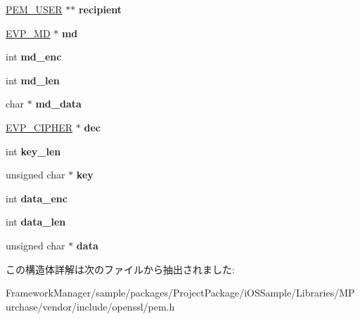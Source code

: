 \begin{DoxyCompactItemize}
\item 
\hypertarget{structpem__ctx__st_afa0b3aa999aedfd5e6feb3033a818cca}{}\hyperlink{structpem__recip__st}{P\+E\+M\+\_\+\+U\+S\+E\+R} $\ast$$\ast$ {\bfseries recipient}\label{structpem__ctx__st_afa0b3aa999aedfd5e6feb3033a818cca}

\item 
\hypertarget{structpem__ctx__st_ab27fcbc00038a731e6a73846db8eb9a1}{}\hyperlink{structenv__md__st}{E\+V\+P\+\_\+\+M\+D} $\ast$ {\bfseries md}\label{structpem__ctx__st_ab27fcbc00038a731e6a73846db8eb9a1}

\item 
\hypertarget{structpem__ctx__st_a84e1ec0487b7a71cd941858d667c91ec}{}int {\bfseries md\+\_\+enc}\label{structpem__ctx__st_a84e1ec0487b7a71cd941858d667c91ec}

\item 
\hypertarget{structpem__ctx__st_ab6ce4983829da473db829d6a620e663d}{}int {\bfseries md\+\_\+len}\label{structpem__ctx__st_ab6ce4983829da473db829d6a620e663d}

\item 
\hypertarget{structpem__ctx__st_a9cfdebfaf0e986b87cfe5b8ac80376da}{}char $\ast$ {\bfseries md\+\_\+data}\label{structpem__ctx__st_a9cfdebfaf0e986b87cfe5b8ac80376da}

\item 
\hypertarget{structpem__ctx__st_a72c11edeac11bde0c3de61b6d2547d75}{}\hyperlink{structevp__cipher__st}{E\+V\+P\+\_\+\+C\+I\+P\+H\+E\+R} $\ast$ {\bfseries dec}\label{structpem__ctx__st_a72c11edeac11bde0c3de61b6d2547d75}

\item 
\hypertarget{structpem__ctx__st_a96d2bba210ec4b53db3917f08ef8da64}{}int {\bfseries key\+\_\+len}\label{structpem__ctx__st_a96d2bba210ec4b53db3917f08ef8da64}

\item 
\hypertarget{structpem__ctx__st_a04828e1e74f1ef05345ed12d75933fd7}{}unsigned char $\ast$ {\bfseries key}\label{structpem__ctx__st_a04828e1e74f1ef05345ed12d75933fd7}

\item 
\hypertarget{structpem__ctx__st_a24116aab3153216d3d3692db34bb1d6d}{}int {\bfseries data\+\_\+enc}\label{structpem__ctx__st_a24116aab3153216d3d3692db34bb1d6d}

\item 
\hypertarget{structpem__ctx__st_a52bb16434d30404e5678b162b7a3e75b}{}int {\bfseries data\+\_\+len}\label{structpem__ctx__st_a52bb16434d30404e5678b162b7a3e75b}

\item 
\hypertarget{structpem__ctx__st_a15db0e222afb61994640814a0a5555cb}{}unsigned char $\ast$ {\bfseries data}\label{structpem__ctx__st_a15db0e222afb61994640814a0a5555cb}

\end{DoxyCompactItemize}


この構造体詳解は次のファイルから抽出されました\+:\begin{DoxyCompactItemize}
\item 
Framework\+Manager/sample/packages/\+Project\+Package/i\+O\+S\+Sample/\+Libraries/\+M\+Purchase/vendor/include/openssl/pem.\+h\end{DoxyCompactItemize}
